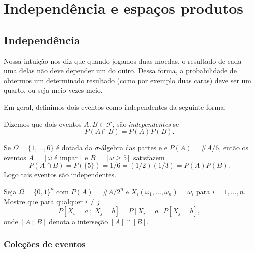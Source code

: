 
\chapter{Independência e espaços produtos}

\section{Independência}

Nossa intuição nos diz que quando jogamos duas moedas, o resultado de cada uma delas não deve depender um do outro.
Dessa forma, a probabilidade de obtermos um determinado resultado (como por exemplo duas caras) deve ser um quarto, ou seja meio vezes meio.

Em geral, definimos dois eventos como independentes da seguinte forma.

\begin{definition}
  Dizemos que dois eventos $A, B \in \mathcal{F}$, são \emph{independentes}  se
  \begin{equation}
    P(A \cap B) = P(A) P(B).
  \end{equation}
\end{definition}

\begin{example}
  Se $\Omega = \{1, \dots, 6\}$ é dotada da $\sigma$-álgebra das partes e e $P(A) = \#A/6$, então os eventos $A = [\omega \text{ é impar}]$ e $B = [\omega \geq 5]$ satisfazem
  \begin{equation}
    P(A \cap B) = P(\{5\}) = 1/6 = (1/2) (1/3) = P(A) P(B).
  \end{equation}
  Logo tais eventos são independentes.
\end{example}

\begin{exercise}
  Seja $\Omega = \{0,1\}^n$ com $P(A) = \#A/2^n$ e $X_i(\omega_1, \dots, \omega_n) = \omega_i$ para $i = 1, \dots, n$.
  Mostre que para qualquer $i\ne j$
  \begin{equation}
    P[X_i = a\ ; \ X_j = b] = P[X_i = a] P[X_j = b],
  \end{equation}
  onde $[A\ ; \ B]$ denota a interseção $[A] \cap [B]$.
\end{exercise}

\subsection{Coleções de eventos}

